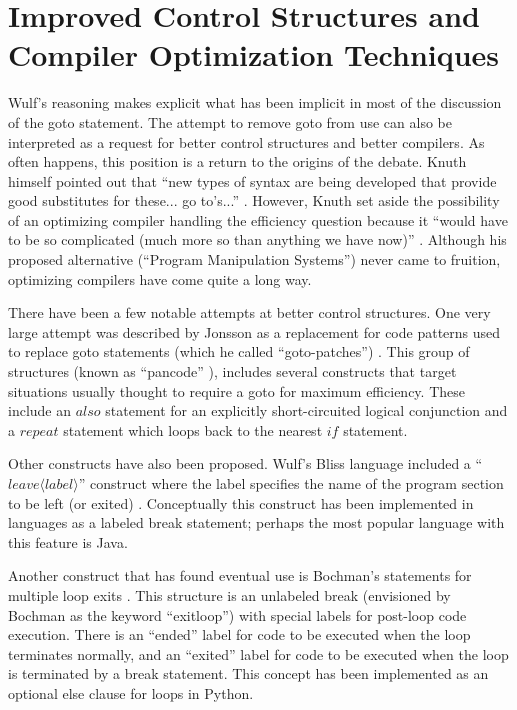 \documentclass[letterpaper,10pt,twocolumn]{article}
\begin{document}
\section{Improved Control Structures and Compiler Optimization Techniques}

Wulf's reasoning makes explicit what has been implicit in most of the discussion
of the goto statement.  The attempt to remove goto from use can also be
interpreted as a request for better control structures and better compilers.
As often happens, this position is a return to the origins of the debate.  Knuth
himself pointed out that ``new types of syntax are being developed that provide
good substitutes for these... go to's...'' \cite{knuth}.  However, Knuth set
aside the possibility of an optimizing compiler handling the efficiency question
because it ``would have to be so complicated (much more so than anything we
have now)'' \cite{knuth}.  Although his proposed alternative (``Program
Manipulation Systems'') never came to fruition, optimizing compilers have
come quite a long way.

There have been a few notable attempts at better control structures.  One very
large attempt was described by Jonsson as a replacement for code patterns used
to replace goto statements (which he called ``goto-patches'') \cite{jonsson}.
This group of structures (known as ``pancode'' \cite{jonsson_pancode}), includes
several constructs that target situations usually thought to require a goto for
maximum efficiency. These include an $also$ statement for an explicitly short-circuited
logical conjunction and a $repeat$ statement which loops back to the nearest
$if$ statement.

Other constructs have also been proposed.  Wulf's Bliss language included a
``$leave \langle label \rangle$'' construct where the label specifies the name
of the program section to be left (or exited) \cite{wulf-leave}.  Conceptually
this construct has been implemented in languages as a labeled break statement;
perhaps the most popular language with this feature is Java.

Another construct that has found eventual use is Bochman's statements for
multiple loop exits \cite{bochman}.  This structure is an unlabeled break
(envisioned by Bochman as the keyword ``exitloop'') with special labels for
post-loop code execution.  There is an ``ended'' label for code to be executed
when the loop terminates normally, and an ``exited'' label for code to be
executed when the loop is terminated by a break statement.  This concept has
been implemented as an optional else clause for loops in Python.
\end{document}
